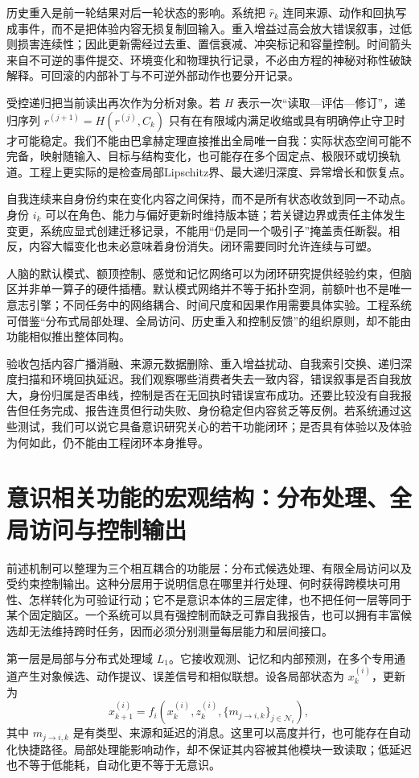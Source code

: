 历史重入是前一轮结果对后一轮状态的影响。系统把 $\hat r_k$ 连同来源、动作和回执写成事件，而不是把体验内容无损复制回输入。重入增益过高会放大错误叙事，过低则损害连续性；因此更新需经过去重、置信衰减、冲突标记和容量控制。时间箭头来自不可逆的事件提交、环境变化和物理执行记录，不必由方程的神秘对称性破缺解释。可回滚的内部补丁与不可逆外部动作也要分开记录。

受控递归把当前读出再次作为分析对象。若 $H$ 表示一次“读取—评估—修订”，递归序列 $r^{(j+1)}=H(r^{(j)},C_k)$ 只有在有限域内满足收缩或具有明确停止守卫时才可能稳定。我们不能由巴拿赫定理直接推出全局唯一自我：实际状态空间可能不完备，映射随输入、目标与结构变化，也可能存在多个固定点、极限环或切换轨道。工程上更实际的是检查局部Lipschitz界、最大递归深度、异常增长和恢复点。

自我连续来自身份约束在变化内容之间保持，而不是所有状态收敛到同一不动点。身份 $i_k$ 可以在角色、能力与偏好更新时维持版本链；若关键边界或责任主体发生变更，系统应显式创建迁移记录，不能用“仍是同一个吸引子”掩盖责任断裂。相反，内容大幅变化也未必意味着身份消失。闭环需要同时允许连续与可塑。

人脑的默认模式、额顶控制、感觉和记忆网络可以为闭环研究提供经验约束，但脑区并非单一算子的硬件插槽。默认模式网络并不等于拓扑空洞，前额叶也不是唯一意志引擎；不同任务中的网络耦合、时间尺度和因果作用需要具体实验。工程系统可借鉴“分布式局部处理、全局访问、历史重入和控制反馈”的组织原则，却不能由功能相似推出整体同构。

验收包括内容广播消融、来源元数据删除、重入增益扰动、自我索引交换、递归深度扫描和环境回执延迟。我们观察哪些消费者失去一致内容，错误叙事是否自我放大，身份归属是否串线，控制是否在无回执时错误宣布成功。还要比较没有自我报告但任务完成、报告连贯但行动失败、身份稳定但内容贫乏等反例。若系统通过这些测试，我们可以说它具备意识研究关心的若干功能闭环；是否具有体验以及体验为何如此，仍不能由工程闭环本身推导。

\section{意识相关功能的宏观结构：分布处理、全局访问与控制输出}
\label{sec:consciousness_macro_structure_summary}
前述机制可以整理为三个相互耦合的功能层：分布式候选处理、有限全局访问以及受约束控制输出。这种分层用于说明信息在哪里并行处理、何时获得跨模块可用性、怎样转化为可验证行动；它不是意识本体的三层定律，也不把任何一层等同于某个固定脑区。一个系统可以具有强控制而缺乏可靠自我报告，也可以拥有丰富候选却无法维持跨时任务，因而必须分别测量每层能力和层间接口。

第一层是局部与分布式处理域 $L_1$。它接收观测、记忆和内部预测，在多个专用通道产生对象候选、动作提议、误差信号和相似联想。设各局部状态为 $x_k^{(i)}$，更新为
\[
x_{k+1}^{(i)}=f_i\!\left(x_k^{(i)},z_k^{(i)},
\{m_{j\to i,k}\}_{j\in\mathcal N_i}\right),
\]
其中 $m_{j\to i,k}$ 是有类型、来源和延迟的消息。这里可以高度并行，也可能存在自动化快捷路径。局部处理能影响动作，却不保证其内容被其他模块一致读取；低延迟也不等于低能耗，自动化更不等于无意识。

